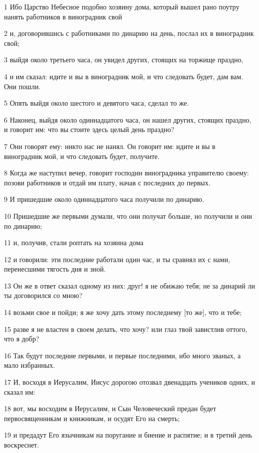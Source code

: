\par 1 Ибо Царство Небесное подобно хозяину дома, который вышел рано поутру нанять работников в виноградник свой
\par 2 и, договорившись с работниками по динарию на день, послал их в виноградник свой;
\par 3 выйдя около третьего часа, он увидел других, стоящих на торжище праздно,
\par 4 и им сказал: идите и вы в виноградник мой, и что следовать будет, дам вам. Они пошли.
\par 5 Опять выйдя около шестого и девятого часа, сделал то же.
\par 6 Наконец, выйдя около одиннадцатого часа, он нашел других, стоящих праздно, и говорит им: что вы стоите здесь целый день праздно?
\par 7 Они говорят ему: никто нас не нанял. Он говорит им: идите и вы в виноградник мой, и что следовать будет, получите.
\par 8 Когда же наступил вечер, говорит господин виноградника управителю своему: позови работников и отдай им плату, начав с последних до первых.
\par 9 И пришедшие около одиннадцатого часа получили по динарию.
\par 10 Пришедшие же первыми думали, что они получат больше, но получили и они по динарию;
\par 11 и, получив, стали роптать на хозяина дома
\par 12 и говорили: эти последние работали один час, и ты сравнял их с нами, перенесшими тягость дня и зной.
\par 13 Он же в ответ сказал одному из них: друг! я не обижаю тебя; не за динарий ли ты договорился со мною?
\par 14 возьми свое и пойди; я же хочу дать этому последнему [то же], что и тебе;
\par 15 разве я не властен в своем делать, что хочу? или глаз твой завистлив оттого, что я добр?
\par 16 Так будут последние первыми, и первые последними, ибо много званых, а мало избранных.
\par 17 И, восходя в Иерусалим, Иисус дорогою отозвал двенадцать учеников одних, и сказал им:
\par 18 вот, мы восходим в Иерусалим, и Сын Человеческий предан будет первосвященникам и книжникам, и осудят Его на смерть;
\par 19 и предадут Его язычникам на поругание и биение и распятие; и в третий день воскреснет.
